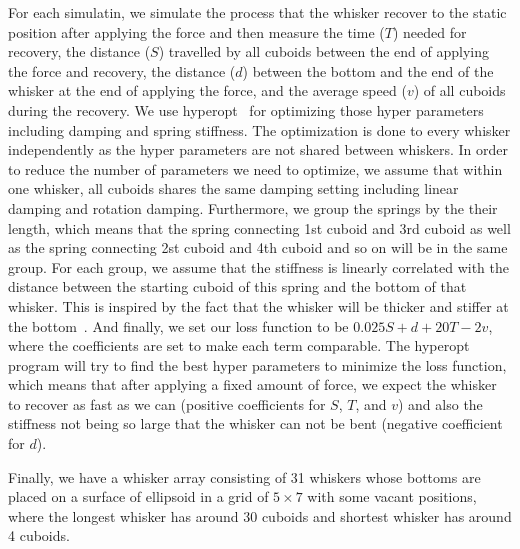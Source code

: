 For each simulatin, we simulate the process that the whisker recover to the static position after applying the force and then measure the time ($T$) needed for recovery, the distance ($S$) travelled by all cuboids between the end of applying the force and recovery, the distance ($d$) between the bottom and the end of the whisker at the end of applying the force, and the average speed ($v$) of all cuboids during the recovery.
We use hyperopt~\cite{bergstra2013hyperopt} for optimizing those hyper parameters including damping and spring stiffness. The optimization is done to every whisker independently as the hyper parameters are not shared between whiskers.
In order to reduce the number of parameters we need to optimize, we assume that within one whisker, all cuboids shares the same damping setting including linear damping and rotation damping.
Furthermore, we group the springs by the their length, which means that the spring connecting 1st cuboid and 3rd cuboid as well as the spring connecting 2st cuboid and 4th cuboid and so on will be in the same group.
For each group, we assume that the stiffness is linearly correlated with the distance between the starting cuboid of this spring and the bottom of that whisker.
This is inspired by the fact that the whisker will be thicker and stiffer at the bottom~\cite{Hartmann:2015}.
And finally, we set our loss function to be $0.025S + d + 20T - 2v$, where the coefficients are set to make each term comparable.
The hyperopt program will try to find the best hyper parameters to minimize the loss function, which means that after applying a fixed amount of force, we expect the whisker to recover as fast as we can (positive coefficients for $S$, $T$, and $v$) and also the stiffness not being so large that the whisker can not be bent (negative coefficient for $d$).

Finally, we have a whisker array consisting of 31 whiskers whose bottoms are placed on a surface of ellipsoid in a grid of $5\times7$ with some vacant positions, where the longest whisker has around 30 cuboids and shortest whisker has around 4 cuboids. 
